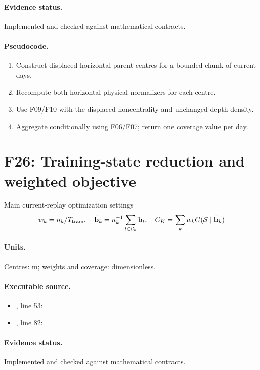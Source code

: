 \documentclass[10pt]{article}
\begin{document}
\paragraph{Evidence status.} Implemented and checked against mathematical contracts.
\paragraph{Pseudocode.}
\begin{enumerate}[leftmargin=*]
\item Construct displaced horizontal parent centres for a bounded chunk of current days.
\item Recompute both horizontal physical normalizers for each centre.
\item Use F09/F10 with the displaced noncentrality and unchanged depth density.
\item Aggregate conditionally using F06/F07; return one coverage value per day.
\end{enumerate}
\newpage
\section*{F26: Training-state reduction and weighted objective}
Main current-replay optimization settings
\begin{gather*}w_k=n_k/T_{\rm train},\quad\bar{\mathbf b}_k=n_k^{-1}\sum_{t\in\mathcal C_k}\mathbf b_t,\quad C_K=\sum_kw_kC(\mathcal S\mid\bar{\mathbf b}_k)\end{gather*}
\paragraph{Units.} Centres: m; weights and coverage: dimensionless.
\paragraph{Executable source.}
\begin{itemize}[leftmargin=*]
\item {}, line 53: 
\item {}, line 82: 
\end{itemize}
\paragraph{Evidence status.} Implemented and checked against mathematical contracts.
\end{document}
